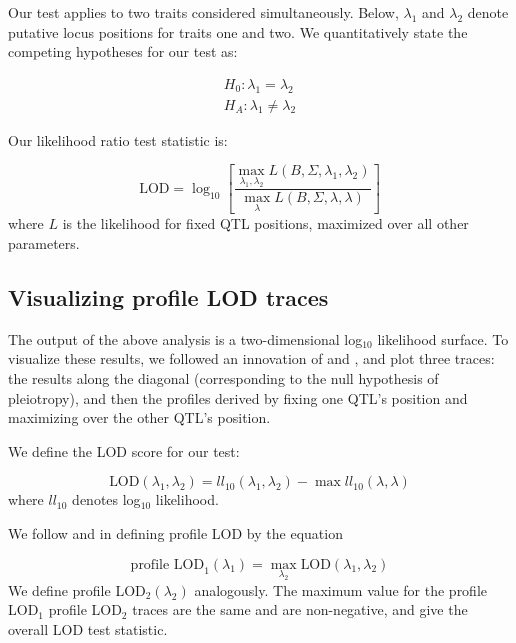 \documentclass[12pt,twoside, lineno]{gsajnl}
\begin{document}
Our test applies to two traits considered simultaneously. Below,
$\lambda_1$ and $\lambda_2$ denote putative locus positions for traits
one and two. We quantitatively state the competing hypotheses for our
test as:

\begin{eqnarray}
H_0: \lambda_1 = \lambda_2 \nonumber\\
H_A: \lambda_1 \neq \lambda_2
\label{eqn:hypotheses}
\end{eqnarray}

\noindent Our likelihood ratio test statistic is:

\begin{equation}
\text{LOD} = \log_{10} \left[ \frac{\max_{\lambda_1, \lambda_2} L(B, \Sigma, \lambda_1, \lambda_2)}{
    \max_\lambda L(B, \Sigma, \lambda, \lambda)} \right]
\label{eqn:test-statistic}
\end{equation}
where $L$ is the likelihood for fixed QTL positions,
maximized over all other parameters.

\subsection{Visualizing profile LOD traces}

The output of the above analysis is a two-dimensional log$_{10}$ likelihood
surface. To visualize these results, we followed an innovation of \citet{zeng2000genetic} and
\citet{tian2016dissection}, and plot three traces: the results along the
diagonal (corresponding to the null hypothesis of pleiotropy), and
then the profiles derived by fixing one QTL's position
and maximizing over the other QTL's position.

We define the LOD score for our test:

\begin{equation}
\text{LOD}(\lambda_1, \lambda_2) = ll_{10}(\lambda_1, \lambda_2) - \max ll_{10}(\lambda, \lambda)
\label{eq:lodpvl}
\end{equation}
where $ll_{10}$ denotes log$_{10}$ likelihood.

We follow \citet{zeng2000genetic} and \citet{tian2016dissection} in
defining profile LOD by the equation

\begin{equation}
\text{profile LOD}_1(\lambda_1) = \max_{\lambda_2}\text{LOD}(\lambda_1, \lambda_2)
\label{eq:profilelod}
\end{equation}
We define profile LOD$_2(\lambda_2)$ analogously.
The maximum value for the profile LOD$_1$
profile LOD$_2$ traces are the same and are non-negative, and give the
overall LOD test statistic.
\end{document}

